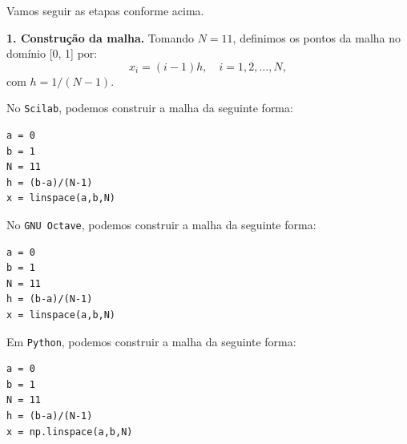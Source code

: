 \begin{sol} Vamos seguir as etapas conforme acima.

  {\bf 1. Construção da malha.} Tomando $N=11$, definimos os pontos da malha no domínio [0, 1] por:
  \begin{equation*}
    x_i = (i-1)h,\quad i=1, 2, \dotsc, N,
  \end{equation*}
com $h = 1/(N-1)$.

\ifisscilab
No \verb+Scilab+, podemos construir a malha da seguinte forma:
\begin{verbatim}
a = 0
b = 1
N = 11
h = (b-a)/(N-1)
x = linspace(a,b,N)
\end{verbatim}
\fi
\ifisoctave
No \verb+GNU Octave+, podemos construir a malha da seguinte forma:
\begin{verbatim}
a = 0
b = 1
N = 11
h = (b-a)/(N-1)
x = linspace(a,b,N)
\end{verbatim}
\fi
\ifispython
Em \verb+Python+, podemos construir a malha da seguinte forma:
\begin{verbatim}
a = 0
b = 1
N = 11
h = (b-a)/(N-1)
x = np.linspace(a,b,N)
\end{verbatim}
\fi


\end{sol}
